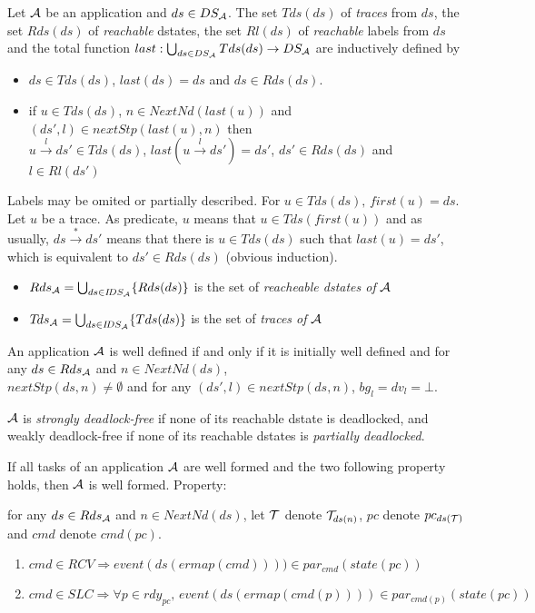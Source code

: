 \documentclass{article}
\begin{document}
\begin{definition}\label{def-traces} Let ${\cal A}$ be an application and $ds\in DS_{\cal A}$. The set $Tds(ds)$ of {\em traces} from $ds$, the set $Rds(ds)$ of {\em reachable} dstates, the set $Rl(ds)$ of {\em reachable} labels from $ds$ and the total function $last:\bigcup_{ds\in DS_{\cal A}}Tds(ds)\rightarrow DS_{\cal A}$ are inductively defined by
\begin{itemize}
\item $ds \in Tds(ds)$, $last(ds)=ds$ and $ds\in Rds(ds)$. 
\item if $u\in Tds(ds)$, $n\in NextN\!d(last(u))$ and $(ds',l)\in nextStp(last(u),n)$ then\\
      $u\xrightarrow{l}ds'\in Tds(ds)$, $last(u\xrightarrow{l}ds')=ds'$, $ds'\in Rds(ds)$ and $l\in Rl(ds')$
\end{itemize}
Labels may be omited or partially described. For $u\in Tds(ds),\,first(u)=ds$.\\
Let $u$ be a trace. As predicate, $u$ means that $u\in Tds(first(u))$ and as usually, $ds\xrightarrow* ds'$ means that there is $u\in Tds(ds)$ such that $last(u)= ds'$, which is equivalent to $ds'\in Rds(ds)$ (obvious induction).
\begin{itemize}
\item $Rds_{\cal A}=\bigcup_{ds\in I\!DS_{\cal A}}\{Rds(ds)\}$ is the set of {\em reacheable dstates of} ${\cal A}$
\item $T\!ds_{\cal A}=\bigcup_{ds\in I\!DS_{\cal A}}\{Tds(ds)\}$ is the set of {\em traces of} ${\cal A}$
\end{itemize}
\end{definition}
\begin{definition}\label{def-wda} An application ${\cal A}$ is well defined if and only if it is initially well defined and for any $ds\in Rds_{\cal A}$ and $n\in NextN\!d(ds)$,\\ $nextStp(ds,n)\neq\emptyset$ and for any $(ds',l)\in nextStp(ds,n)$, $bg_l=dv_l=\bot$.

${\cal A}$ is {\em strongly deadlock-free} if none of its reachable dstate is deadlocked, and weakly deadlock-free if none of its reachable dstates is {\em partially deadlocked}.
\end{definition}
\begin{fact}\label{fact-wda} If all tasks of an application ${\cal A}$ are well formed and the two following property holds, then ${\cal A}$ is well formed. Property:

for any $ds\in Rds_{\cal A}$ and $n\in NextN\!d(ds)$, let ${\cal T}$ denote ${\cal T}_{ds(n)}$, $pc$ denote $pc_{ds({\cal T})}$ and $cmd$ denote $cmd(pc)$.
\begin{enumerate}
  \item $cmd\in RCV \Rightarrow event(ds(ermap(cmd))))\in par_{cmd}(state(pc))$
  \item $cmd\in S\!LC \Rightarrow \forall p\in rdy_{pc},\,event(ds(ermap(cmd(p))))\in par_{cmd(p)}(state(pc))$
\end{enumerate}
\end{fact}
\end{document}
